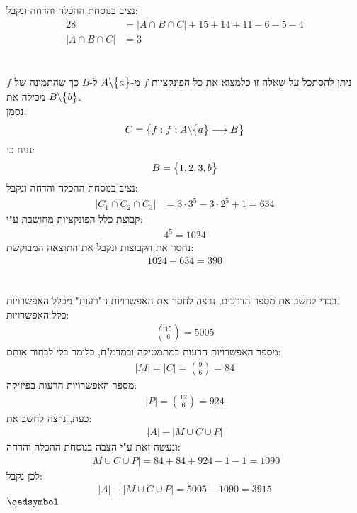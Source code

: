 \documentclass[a4paper, 12pt, leqno]{article}
\newcommand{\eq}[1]{\begin{align*}#1\end{align*}}
\newcommand{\set}[1]{\big{\{} #1 \big{\}}}
\renewcommand{\qed}{\hfill\(\qedsymbol\)}
\begin{document}
\section{}
נציב בנוסחת ההכלה והדחה ונקבל:
\eq{
    28&=|A\cap{B}\cap{C}|+15+14+11-6-5-4\\
    |A\cap{B}\cap{C}|&=3
}

\section{}
ניתן להסתכל על שאלה זו כלמצוא את כל הפונקציות $f$ מ-$A\backslash\set{a}$ ל-$B$ כך שהתמונה של $f$ מכילה את $B\backslash\set{b}$.\\
נסמן:
\eq{
    C=\set{f:f:A\backslash\set{a}\longrightarrow{B}}
}
נניח כי:
\eq{
    B=\set{1,2,3,b}
}
נציב בנוסחת ההכלה והדחה ונקבל:
\eq{
    |C_1\cap{C_2}\cap{C_3}|&=3\cdot3^5-3\cdot2^5+1=634
}
קבוצת כלל הפונקציות מחושבת ע"י:
\eq{
    4^5=1024
}
נחסר את הקבוצות ונקבל את התוצאה המבוקשת:
\eq{
    1024-634=390
}

\section{}
בכדי לחשב את מספר הדרכים, נרצה לחסר את האפשרויות ה"רעות" מכלל האפשרויות.\\
כלל האפשרויות:
\eq{
    \binom{15}{6}=5005
}
מספר האפשרויות הרעות במתמטיקה ובמדמ"ח, כלומר בלי לבחור אותם:
\eq{
    |M|=|C|=\binom{9}{6}=84
}
מספר האפשרויות הרעות בפיזיקה:
\eq{
    |P|=\binom{12}{6}=924
}
כעת, נרצה לחשב את:
\eq{
    |A|-|M\cup{C}\cup{P}|
}
ונעשה זאת ע"י הצבה בנוסחת ההכלה והדחה:
\eq{
    |M\cup{C}\cup{P}|=84+84+924-1-1=1090
}
לכן נקבל:
\eq{
    |A|-|M\cup{C}\cup{P}|=5005-1090=3915
}
\qed


\end{document}
